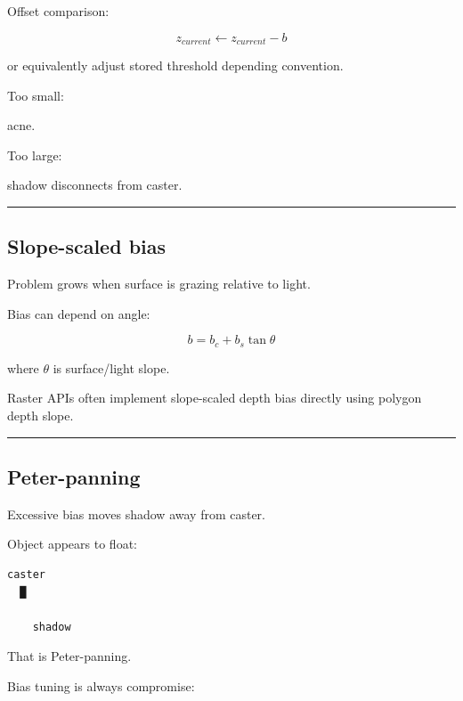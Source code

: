 \hypertarget{04-visual-computing-ii-ch040-constant-bias}{}

Offset comparison:

\[
z_{current}
\leftarrow
z_{current}-b
\]

or equivalently adjust stored threshold depending convention.

Too small:

acne.

Too large:

shadow disconnects from caster.

\begin{center}\rule{0.5\linewidth}{0.5pt}\end{center}

\subsection{Slope-scaled bias}\label{04-visual-computing-ii-ch040-slope-scaled-bias}

\hypertarget{04-visual-computing-ii-ch040-slope-scaled-bias}{}

Problem grows when surface is grazing relative to light.

Bias can depend on angle:

\[
\boxed{
b=
b_c+
b_s\tan\theta
}
\]

where \(\theta\) is surface/light slope.

Raster APIs often implement slope-scaled depth bias directly using polygon depth slope.

\begin{center}\rule{0.5\linewidth}{0.5pt}\end{center}

\subsection{Peter-panning}\label{04-visual-computing-ii-ch040-peter-panning}

\hypertarget{04-visual-computing-ii-ch040-peter-panning}{}

Excessive bias moves shadow away from caster.

Object appears to float:

\begin{verbatim}
caster
  █

    shadow
\end{verbatim}

That is Peter-panning.

Bias tuning is always compromise:

